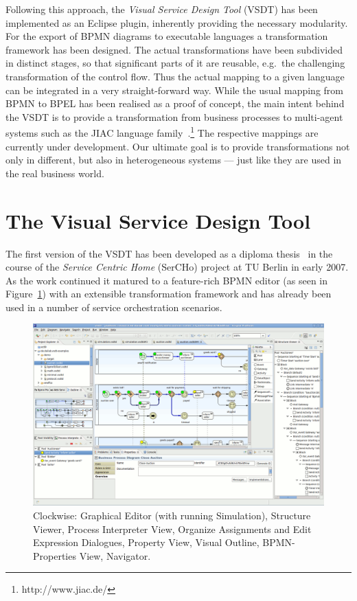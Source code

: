 Following this approach, the \emph{Visual Service Design Tool} (VSDT) has been
implemented as an Eclipse plugin, inherently providing the necessary modularity.
For the export of BPMN diagrams to executable languages a transformation framework
has been designed.  The actual transformations have been subdivided in distinct
stages, so that significant parts of it are reusable, e.g.\ the challenging
transformation of the control flow.  Thus the actual mapping to a given language
can be integrated in a very straight-forward way.  While the usual mapping from
BPMN to BPEL has been realised as a proof of concept, the main intent behind the
VSDT is to provide a transformation from business processes to multi-agent systems
such as the JIAC language family~\cite{Hirsch2009Multi-Agent}.\footnote{http://www.jiac.de/}
The respective mappings are currently under development.  Our ultimate goal is to
provide transformations not only in different, but also in heterogeneous systems
--- just like they are used in the real business world.



\section{The Visual Service Design Tool}
\label{sec:intro_vsdt}

The first version of the VSDT has been developed as a diploma
thesis~\cite{kuester2007development} in the course of the \emph{Service Centric
Home} (SerCHo) project at TU Berlin in early 2007.  As the work continued it
matured to a feature-rich BPMN editor (as seen in Figure~\ref{fig:screen}) with
an extensible transformation framework and has already been used in a number of
service orchestration scenarios.

\begin{figure}
	\centering
	\includegraphics[height=.4\textheight]{figures/vsdt_1-3-0.png}
	\caption{Clockwise: Graphical Editor (with running Simulation), Structure
	Viewer, Process Interpreter View, Organize Assignments and Edit Expression
	Dialogues, Property View, Visual Outline, BPMN-Properties View, Navigator.}
	\label{fig:screen}
\end{figure}



